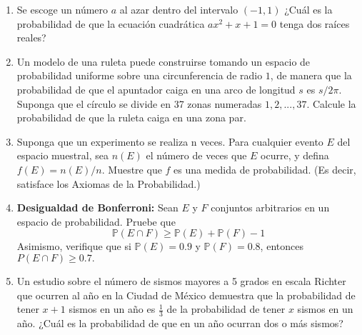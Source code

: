 \documentclass[10pt,a4paper]{article}
\begin{document}
\begin{enumerate}
		\item Se escoge un número $a$ al azar dentro del intervalo $(-1,1)$ ¿Cuál es la probabilidad de que la ecuación cuadrática $ax^2 + x + 1 = 0$ tenga dos raíces reales?
		
		\item Un modelo de una ruleta puede construirse tomando un espacio de probabilidad uniforme sobre una circunferencia de radio $1$, de manera que la probabilidad de que el apuntador caiga en una arco de longitud $s$ es $s/2\pi$. Suponga que el círculo se divide en 37 zonas numeradas $1, 2, . . . , 37$. Calcule la probabilidad de que la ruleta caiga en una zona par.
		
		\item Suponga que un experimento se realiza n veces. Para cualquier evento $E$ del espacio muestral, sea $n(E)$ el número de veces que $E$ ocurre, y defina $f(E) = n(E)/n$. Muestre que $f$ es una medida de probabilidad. (Es decir, satisface los Axiomas de la Probabilidad.)
		
		\item \textbf{Desigualdad de Bonferroni:}
		Sean $E$ y $F$ conjuntos arbitrarios en un espacio de probabilidad. Pruebe que
		\[
		\mathbb{P}(E \cap F) \ge \mathbb{P}(E) + \mathbb{P}(F) - 1
		\]
		Asimismo, verifique que si $\mathbb{P}(E) = 0.9$ y $\mathbb{P}(F) = 0.8$, entonces $P(E \cap F ) \ge 0.7.$  
		
		\item Un estudio sobre el número de sismos mayores a 5 grados en escala Richter que ocurren al año en la Ciudad de México demuestra que la probabilidad de tener $x+1$ sismos en un año es $\frac{1}{3}$ de la probabilidad de tener $x$ sismos en un año. ¿Cuál es la probabilidad de que en un año ocurran dos o más sismos?
		
		
		
	\end{enumerate}
	
\end{document}
